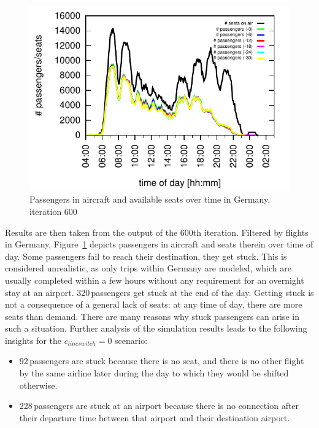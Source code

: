 \begin{figure}[t]
	\centering
	\includegraphics[width=0.9\linewidth]{./extending/figures/air/in_vehicle_histogram_flight_1876-1881_it_600.pdf}
	\caption{Passengers in aircraft and available seats over time in Germany, iteration 600}
	\label{fig:2009_passengers_seats}
\end{figure}

Results are then taken from the output of the 600th iteration. 
Filtered by flights in Germany, Figure~\ref{fig:2009_passengers_seats} depicts passengers in aircraft and seats therein over time of day. 
Some passengers fail to reach their destination, they get stuck.   
This is considered unrealistic, as only trips within Germany are modeled, which are usually completed within a few hours without any requirement for an overnight stay at an airport. 
320\,passengers get stuck at the end of the day. %
Getting stuck is not a consequence of a general lack of seats: at any time of day, there are more seats than demand.  
%
There are many reasons why stuck passengers can arise in such a situation.
%
Further analysis of the simulation results leads to the following insights for the $c_{lineswitch} = 0$ scenario:
\begin{itemize}

\item 92\,passengers are stuck because there is no seat, and there is no other flight by the same airline later during the day to which they would be shifted otherwise.

\item 228\,passengers are stuck at an airport because there is no connection after their departure time 
	between that airport and their destination airport. 
\end{itemize}

